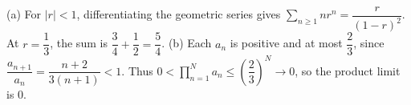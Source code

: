 (a) For $|r|<1$, differentiating the geometric series gives $\sum_{n\ge1}nr^n=\dfrac{r}{(1-r)^2}$. At $r=\dfrac{1}{3}$, the sum is $\dfrac{3}{4}+\dfrac{1}{2}=\boxed{\dfrac{5}{4}}$. (b) Each $a_n$ is positive and at most $\dfrac{2}{3}$, since $\dfrac{a_{n+1}}{a_n}=\dfrac{n+2}{3(n+1)}<1$. Thus $0<\prod_{n=1}^Na_n\le(\dfrac{2}{3})^N\to0$, so the product limit is $\boxed0$.
